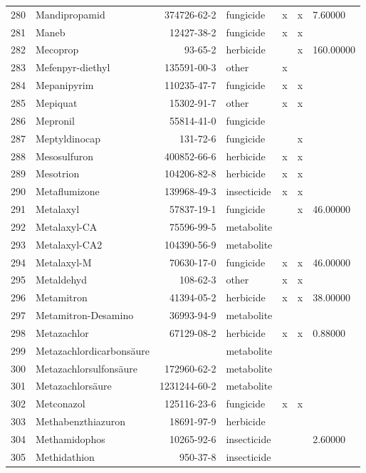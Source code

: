 \begin{longtable}{lp{4cm}rlp{1.3cm}p{1.3cm}p{1.5cm}}
  280 & Mandipropamid & 374726-62-2 & fungicide & x & x & 7.60000 \\ 
  281 & Maneb & 12427-38-2 & fungicide & x & x &  \\ 
  282 & Mecoprop & 93-65-2 & herbicide &  & x & 160.00000 \\ 
  283 & Mefenpyr-diethyl & 135591-00-3 & other & x &  &  \\ 
  284 & Mepanipyrim & 110235-47-7 & fungicide & x & x &  \\ 
  285 & Mepiquat & 15302-91-7 & other & x & x &  \\ 
  286 & Mepronil & 55814-41-0 & fungicide &  &  &  \\ 
  287 & Meptyldinocap & 131-72-6 & fungicide &  & x &  \\ 
  288 & Mesosulfuron & 400852-66-6 & herbicide & x & x &  \\ 
  289 & Mesotrion & 104206-82-8 & herbicide & x & x &  \\ 
  290 & Metaflumizone & 139968-49-3 & insecticide & x & x &  \\ 
  291 & Metalaxyl & 57837-19-1 & fungicide &  & x & 46.00000 \\ 
  292 & Metalaxyl-CA & 75596-99-5 & metabolite &  &  &  \\ 
  293 & Metalaxyl-CA2 & 104390-56-9 & metabolite &  &  &  \\ 
  294 & Metalaxyl-M & 70630-17-0 & fungicide & x & x & 46.00000 \\ 
  295 & Metaldehyd & 108-62-3 & other & x & x &  \\ 
  296 & Metamitron & 41394-05-2 & herbicide & x & x & 38.00000 \\ 
  297 & Metamitron-Desamino & 36993-94-9 & metabolite &  &  &  \\ 
  298 & Metazachlor & 67129-08-2 & herbicide & x & x & 0.88000 \\ 
  299 & Metazachlordicarbonsäure &  & metabolite &  &  &  \\ 
  300 & Metazachlorsulfonsäure & 172960-62-2 & metabolite &  &  &  \\ 
  301 & Metazachlorsäure & 1231244-60-2 & metabolite &  &  &  \\ 
  302 & Metconazol & 125116-23-6 & fungicide & x & x &  \\ 
  303 & Methabenzthiazuron & 18691-97-9 & herbicide &  &  &  \\ 
  304 & Methamidophos & 10265-92-6 & insecticide &  &  & 2.60000 \\ 
  305 & Methidathion & 950-37-8 & insecticide &  &  &  \\ 

\end{longtable}
